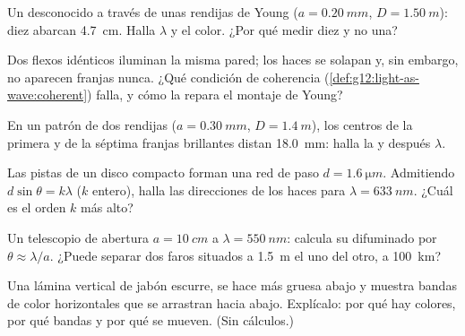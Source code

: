 \begin{exercise}[$\star\star$]\label{exo:g12:light-as-wave:7}
Un  desconocido a través de unas rendijas de Young
($a = \qty{0.20}{mm}$, $D = \qty{1.50}{m}$): diez  abarcan
\qty{4.7}{cm}. Halla $\lambda$ y el color. ¿Por qué medir diez y no
una?
\end{exercise}

\begin{exercise}[$\star\star$]\label{exo:g12:light-as-wave:8}
Dos flexos idénticos iluminan la misma pared; los haces se solapan y,
sin embargo, no aparecen franjas nunca. ¿Qué condición de coherencia
(\cref{def:g12:light-as-wave:coherent}) falla, y cómo la repara el
montaje de Young?
\end{exercise}

\begin{exercise}[$\star\star$]\label{exo:g12:light-as-wave:9}
En un patrón de dos rendijas ($a = \qty{0.30}{mm}$, $D = \qty{1.4}{m}$),
los centros de la primera y de la séptima franjas brillantes distan
\qty{18.0}{mm}: halla la  y después $\lambda$.
\end{exercise}

\begin{exercise}[$\star\star$]\label{exo:g12:light-as-wave:10}
Las pistas de un disco compacto forman una red de paso
$d = \qty{1.6}{\micro m}$. Admitiendo $d \sin\theta = k\lambda$ ($k$
entero), halla las direcciones de los haces para
$\lambda = \qty{633}{nm}$. ¿Cuál es el orden $k$ más alto?
\end{exercise}

\begin{exercise}[$\star\star$]\label{exo:g12:light-as-wave:11}
Un telescopio de abertura $a = \qty{10}{cm}$ a
$\lambda = \qty{550}{nm}$: calcula su difuminado por 
$\theta \approx \lambda/a$. ¿Puede separar dos faros situados a
\qty{1.5}{m} el uno del otro, a \qty{100}{km}?
\end{exercise}

\begin{exercise}[$\star\star\star$]\label{exo:g12:light-as-wave:12}
Una lámina vertical de jabón escurre, se hace más gruesa abajo y muestra
bandas de color horizontales que se arrastran hacia abajo. Explícalo:
por qué hay colores, por qué bandas y por qué se mueven. (Sin
cálculos.)
\end{exercise}

